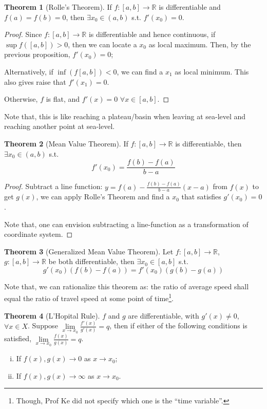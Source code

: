 \documentclass[12pt]{article}
\newcommand{\R}{{\mathbb R}}
\theoremstyle{definition}
\newtheorem{theorem}{Theorem}[section]
\theoremstyle{plain}
\begin{document}
\begin{theorem}
    [Rolle's Theorem]
    If $f:[a,b] \to \R$ is differentiable and  $f(a) = f(b) = 0$, then $\exists
    x_0 \in (a,b)$ s.t. $f'(x_0) = 0$.
    \begin{proof}
        Since $f: [a,b] \to \R$ is differentiable and hence continuous, if $\sup
        f([a,b]) > 0$, then we can locate a $x_0$ as local maximum.
        Then, by the previous proposition, $f'(x_0)=0$;

        Alternatively, if $ \inf(f[a,b]) < 0$, we can find a $x_1$ as local
        minimum. This also gives raise that $f'(x_1) = 0$.

        Otherwise, $f$ is flat, and $f'(x) = 0$ $\forall x \in [a,b]$.
    \end{proof}

    Note that, this is like reaching a plateau/basin when leaving at sea-level
    and reaching another point at sea-level.
\end{theorem}

\begin{theorem}
    [Mean Value Theorem]
    If $f: [a,b] \to \R$ is differentiable, then $\exists x _ 0 \in (a,b)$ s.t.
    \[
        f'(x_0) = \frac{f(b) - f(a)}{b-a}
    \]
    \begin{proof}
        Subtract a line function: $y = f(a) - \frac{f(b) - f(a)}{ b-a } (x - a)$
        from $f(x)$ to get $g(x)$, we can apply Rolle's Theorem and find a $x_0$
        that satisfies $g'(x_0) = 0$.

        Note that, one can envision subtracting a line-function as a
        transformation of coordinate system.
    \end{proof}
\end{theorem}

\begin{theorem}
    [Generalized Mean Value Theorem]
    Let $f: [a,b] \to \R$, $g:[a,b] \to \R$ be both differentiable, then
    $\exists x_0 \in [a,b]$ s.t.
    \[
        g'(x_0) (f(b) - f(a)) = f'(x_0) (g(b) - g(a))
    \]

    Note that, we can rationalize this theorem as: the ratio of average speed
    shall equal the ratio of travel speed at some point of time\footnote{Though,
    Prof Ke did not specify which one is the ``time variable''.}.
\end{theorem}

\begin{theorem}
    [L'Hopital Rule]
    $f$ and $g$ are differentiable, with $g'(x) \not = 0$, $\forall x \in X$.
    Suppose $\underset{x \to x_0} \lim \frac{f'(x)}{g'(x)} = q$, then if either
    of the following conditions is satisfied, $\underset{x \to x_0} \lim
    \frac{f(x)}{g(x)} = q$.
    \begin{enumerate}[(i)]
        \item If $f(x), g(x) \to 0$ as $x \to x_0$;
        \item If $f(x), g(x) \to \infty$ as $x \to x_0$.
    \end{enumerate}
\end{theorem}
\end{document}
